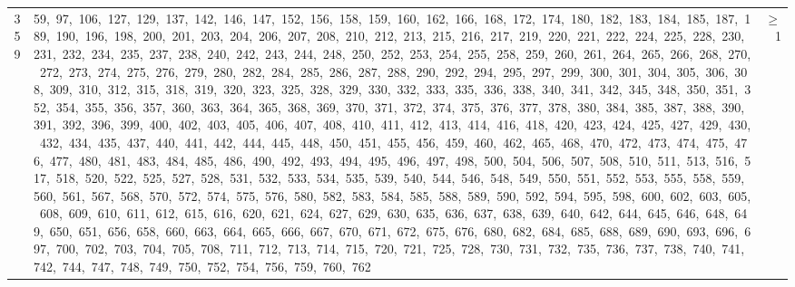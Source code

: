 \begin{longtable}{c|p{}|r}
359 & 59,\ 97,\ 106,\ 127,\ 129,\ 137,\ 142,\ 146,\ 147,\ 152,\ 156,\ 158,\ 159,\ 160,\ 162,\ 166,\ 168,\ 172,\ 174,\ 180,\ 182,\ 183,\ 184,\ 185,\ 187,\ 189,\ 190,\ 196,\ 198,\ 200,\ 201,\ 203,\ 204,\ 206,\ 207,\ 208,\ 210,\ 212,\ 213,\ 215,\ 216,\ 217,\ 219,\ 220,\ 221,\ 222,\ 224,\ 225,\ 228,\ 230,\ 231,\ 232,\ 234,\ 235,\ 237,\ 238,\ 240,\ 242,\ 243,\ 244,\ 248,\ 250,\ 252,\ 253,\ 254,\ 255,\ 258,\ 259,\ 260,\ 261,\ 264,\ 265,\ 266,\ 268,\ 270,\ 272,\ 273,\ 274,\ 275,\ 276,\ 279,\ 280,\ 282,\ 284,\ 285,\ 286,\ 287,\ 288,\ 290,\ 292,\ 294,\ 295,\ 297,\ 299,\ 300,\ 301,\ 304,\ 305,\ 306,\ 308,\ 309,\ 310,\ 312,\ 315,\ 318,\ 319,\ 320,\ 323,\ 325,\ 328,\ 329,\ 330,\ 332,\ 333,\ 335,\ 336,\ 338,\ 340,\ 341,\ 342,\ 345,\ 348,\ 350,\ 351,\ 352,\ 354,\ 355,\ 356,\ 357,\ 360,\ 363,\ 364,\ 365,\ 368,\ 369,\ 370,\ 371,\ 372,\ 374,\ 375,\ 376,\ 377,\ 378,\ 380,\ 384,\ 385,\ 387,\ 388,\ 390,\ 391,\ 392,\ 396,\ 399,\ 400,\ 402,\ 403,\ 405,\ 406,\ 407,\ 408,\ 410,\ 411,\ 412,\ 413,\ 414,\ 416,\ 418,\ 420,\ 423,\ 424,\ 425,\ 427,\ 429,\ 430,\ 432,\ 434,\ 435,\ 437,\ 440,\ 441,\ 442,\ 444,\ 445,\ 448,\ 450,\ 451,\ 455,\ 456,\ 459,\ 460,\ 462,\ 465,\ 468,\ 470,\ 472,\ 473,\ 474,\ 475,\ 476,\ 477,\ 480,\ 481,\ 483,\ 484,\ 485,\ 486,\ 490,\ 492,\ 493,\ 494,\ 495,\ 496,\ 497,\ 498,\ 500,\ 504,\ 506,\ 507,\ 508,\ 510,\ 511,\ 513,\ 516,\ 517,\ 518,\ 520,\ 522,\ 525,\ 527,\ 528,\ 531,\ 532,\ 533,\ 534,\ 535,\ 539,\ 540,\ 544,\ 546,\ 548,\ 549,\ 550,\ 551,\ 552,\ 553,\ 555,\ 558,\ 559,\ 560,\ 561,\ 567,\ 568,\ 570,\ 572,\ 574,\ 575,\ 576,\ 580,\ 582,\ 583,\ 584,\ 585,\ 588,\ 589,\ 590,\ 592,\ 594,\ 595,\ 598,\ 600,\ 602,\ 603,\ 605,\ 608,\ 609,\ 610,\ 611,\ 612,\ 615,\ 616,\ 620,\ 621,\ 624,\ 627,\ 629,\ 630,\ 635,\ 636,\ 637,\ 638,\ 639,\ 640,\ 642,\ 644,\ 645,\ 646,\ 648,\ 649,\ 650,\ 651,\ 656,\ 658,\ 660,\ 663,\ 664,\ 665,\ 666,\ 667,\ 670,\ 671,\ 672,\ 675,\ 676,\ 680,\ 682,\ 684,\ 685,\ 688,\ 689,\ 690,\ 693,\ 696,\ 697,\ 700,\ 702,\ 703,\ 704,\ 705,\ 708,\ 711,\ 712,\ 713,\ 714,\ 715,\ 720,\ 721,\ 725,\ 728,\ 730,\ 731,\ 732,\ 735,\ 736,\ 737,\ 738,\ 740,\ 741,\ 742,\ 744,\ 747,\ 748,\ 749,\ 750,\ 752,\ 754,\ 756,\ 759,\ 760,\ 762 & $\ge$ 1 \\

\end{longtable}
